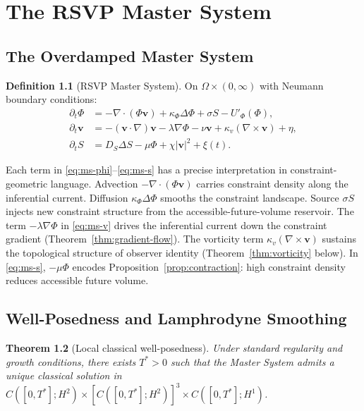 \documentclass[12pt, oneside]{book}
\theoremstyle{plain}
\newtheorem{theorem}{Theorem}[chapter]
\theoremstyle{definition}
\newtheorem{definition}[theorem]{Definition}
\newcommand{\vfield}{\mathbf{v}}
\newcommand{\nab}{\nabla}
\begin{document}
\chapter{The RSVP Master System}
\label{ch:master}

\section{The Overdamped Master System}
\label{sec:overdamped}

\begin{definition}[RSVP Master System]
\label{def:master}
On $\Omega\times(0,\infty)$ with Neumann boundary conditions:
\begin{align}
  \partial_t\Phi &= -\nab\cdot(\Phi\vfield) + \kappa_\Phi\Delta\Phi + \sigma S
    - U'_\Phi(\Phi),
  \label{eq:ms-phi}\\
  \partial_t\vfield &= -(\vfield\cdot\nab)\vfield - \lambda\nab\Phi - \nu\vfield
    + \kappa_v(\nab\times\vfield) + \eta,
  \label{eq:ms-v}\\
  \partial_t S &= D_S\Delta S - \mu\Phi + \chi|\vfield|^2 + \xi(t).
  \label{eq:ms-s}
\end{align}
\end{definition}

Each term in \eqref{eq:ms-phi}--\eqref{eq:ms-s} has a precise interpretation in
constraint-geometric language. Advection $-\nab\cdot(\Phi\vfield)$ carries constraint
density along the inferential current. Diffusion $\kappa_\Phi\Delta\Phi$ smooths the
constraint landscape. Source $\sigma S$ injects new constraint structure from the
accessible-future-volume reservoir. The term $-\lambda\nab\Phi$ in \eqref{eq:ms-v}
drives the inferential current down the constraint gradient (Theorem~\ref{thm:gradient-flow}).
The vorticity term $\kappa_v(\nab\times\vfield)$ sustains the topological structure
of observer identity (Theorem~\ref{thm:vorticity} below). In \eqref{eq:ms-s},
$-\mu\Phi$ encodes Proposition~\ref{prop:contraction}: high constraint density
reduces accessible future volume.

\section{Well-Posedness and Lamphrodyne Smoothing}
\label{sec:wellposed}

\begin{theorem}[Local classical well-posedness]
Under standard regularity and growth conditions, there exists $T^*>0$ such that
the Master System admits a unique classical solution in
$C([0,T^*]; H^2)\times[C([0,T^*]; H^2)]^3\times C([0,T^*]; H^1)$.
\end{theorem}
\end{document}
